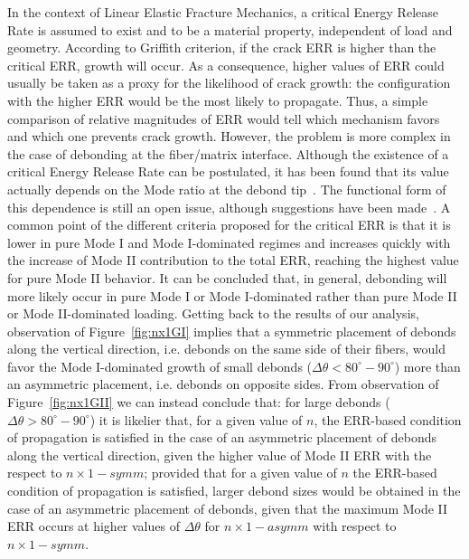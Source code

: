 \documentclass[smallextended]{svjour3}       %
\begin{document}
In the context of Linear Elastic Fracture Mechanics, a critical Energy Release Rate is assumed to exist and to be a material property, independent of load and geometry. According to Griffith criterion, if the crack ERR is higher than the critical ERR, growth will occur. As a consequence, higher values of ERR could usually be taken as a proxy for the likelihood of crack growth: the configuration with the higher ERR would be the most likely to propagate. Thus, a simple comparison of relative magnitudes of ERR would tell which mechanism favors and which one prevents crack growth. However, the problem is more complex in the case of debonding at the fiber/matrix interface. Although the existence of a critical Energy Release Rate can be postulated, it has been found that its value actually depends on the Mode ratio at the debond tip~\cite{Hutchinson1991}. The functional form of this dependence is still an open issue, although suggestions have been made~\cite{Hutchinson1991,Mantic2009}. A common point of the different criteria proposed for the critical ERR is that it is lower in pure Mode I and Mode I-dominated regimes and increases quickly with the increase of Mode II contribution to the total ERR, reaching the highest value for pure Mode II behavior. It can be concluded that, in general, debonding will more likely occur in pure Mode I or Mode I-dominated rather than pure Mode II or Mode II-dominated loading. Getting back to the results of our analysis, observation of Figure~\ref{fig:nx1GI} implies that a symmetric placement of debonds along the vertical direction, i.e. debonds on the same side of their fibers, would favor the Mode I-dominated growth of small debonds ($\Delta\theta<80^{\circ}-90^{\circ}$) more than an asymmetric placement, i.e. debonds on opposite sides. From observation of Figure~\ref{fig:nx1GII} we can instead conclude that: for large debonds ($\Delta\theta>80^{\circ}-90^{\circ}$) it is likelier that, for a given value of $n$, the ERR-based condition of propagation is satisfied in the case of an asymmetric placement of debonds along the vertical direction, given the higher value of Mode II ERR with the respect to $n\times 1-symm$; provided that for a given value of $n$ the ERR-based condition of propagation is satisfied, larger debond sizes would be obtained in the case of an asymmetric placement of debonds, given that the maximum Mode II ERR occurs at higher values of $\Delta\theta$ for $n\times 1-asymm$ with respect to $n\times 1-symm$.\\
\end{document}

